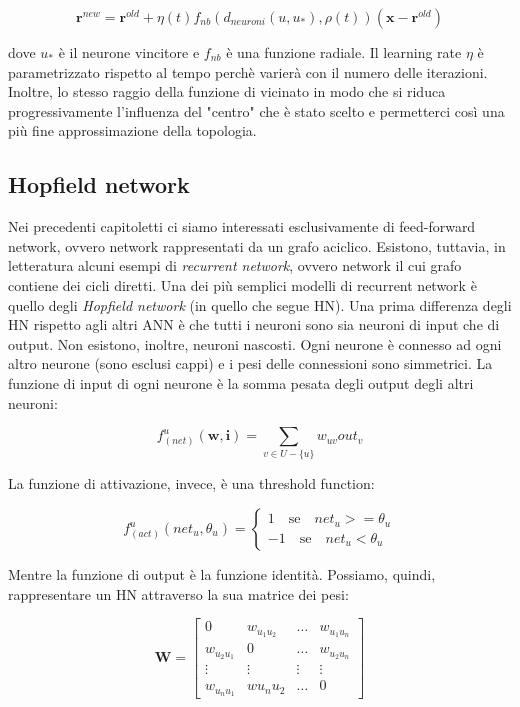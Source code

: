 \documentclass[10pt,a4paper]{article}
\newcommand{\ww}{\mathbf{w}}
\newcommand{\ii}{\mathbf{i}}
\begin{document}
$$
\mathbf{r}^{new} = \mathbf{r}^{old} + \eta(t)f_{nb}(d_{neuroni}(u,u_*),\rho(t))(\mathbf{x} - \mathbf{r}^{old})
$$

dove $u_*$ è il neurone vincitore e $f_{nb}$ è una funzione radiale. Il learning rate $\eta$ è parametrizzato rispetto al tempo perchè varierà con il numero delle iterazioni. Inoltre, lo stesso raggio della funzione di vicinato in modo che si riduca progressivamente l'influenza del "centro" che è stato scelto e permetterci così una più fine approssimazione della topologia.

\subsection{Hopfield network}

Nei precedenti capitoletti ci siamo interessati esclusivamente di feed-forward network, ovvero network rappresentati da un grafo aciclico. Esistono, tuttavia, in letteratura alcuni esempi di \emph{recurrent network}, ovvero network il cui grafo contiene dei cicli diretti. Una dei più semplici modelli di recurrent network è quello degli \emph{Hopfield network} (in quello che segue HN). Una prima differenza degli HN rispetto agli altri ANN è che tutti i neuroni sono sia neuroni di input che di output. Non esistono, inoltre, neuroni nascosti. Ogni neurone è connesso ad ogni altro neurone (sono esclusi cappi) e i pesi delle connessioni sono simmetrici. La funzione di input di ogni neurone è la somma pesata degli output degli altri neuroni:

$$
f_{(net)}^u(\ww,\ii) = \sum_{v \in U - \{u\}} w_{uv} out_v 
$$

La funzione di attivazione, invece, è una threshold function:

$$
f_{(act)}^u(net_u,\theta_u) = \begin{cases}
				1 \quad \text{se} \quad net_u >= \theta_u \\
				-1 \quad \text{se} \quad net_u < \theta_u
							  \end{cases}
$$

Mentre la funzione di output è la funzione identità. Possiamo, quindi, rappresentare un HN attraverso la sua matrice dei pesi:

$$
\mathbf{W} = \begin{bmatrix} 
			0 & w_{u_1 u_2} & \dots & w_{u_1 u_n} \\
			w_{u_2 u_1} & 0 & \dots & w_{u_2 u_n} \\
			\vdots & \vdots & \vdots & \vdots \\
			w_{u_n u_1} & w{u_n u_2} & \dots & 0
			\end{bmatrix}
$$
\end{document}
